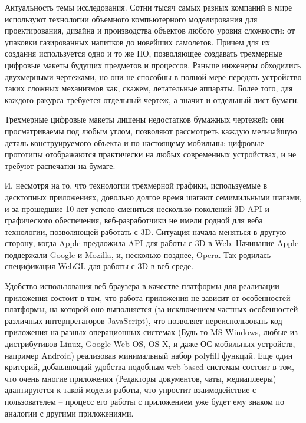\label{sec:intro}

Актуальность темы исследования. 
Сотни тысяч самых разных компаний в мире используют технологии объемного компьютерного моделирования для проектирования, дизайна и производства объектов любого уровня сложности: от упаковки 
газированных напитков до новейших самолетов. Причем для их создания используется одно и то же ПО, позволяющее создавать трехмерные цифровые макеты будущих предметов и процессов.
Раньше инженеры обходились двухмерными чертежами, но они не способны в полной мере передать устройство таких сложных механизмов как, скажем, летательные аппараты. Более того, для 
каждого ракурса требуется отдельный чертеж, а значит и отдельный лист бумаги.


Трехмерные цифровые макеты лишены недостатков бумажных чертежей: они просматриваемы под любым углом, позволяют рассмотреть каждую мельчайшую деталь конструируемого объекта и по-настоящему 
мобильны: цифровые прототипы отображаются практически на любых современных устройствах, и не требуют распечатки на бумаге. 

И, несмотря на то, что технологии трехмерной графики, используемые в десктопных приложениях, довольно долгое время шагают семимильными шагами, и за прошедшие 10 лет успело смениться 
несколько поколений 3D API и графического обеспечения, веб-разработчики не имели родной для веба технологии, позволяющей работать с 3D.
Ситуация начала меняться в другую сторону, когда Apple предложила API для работы с 3D в Web. Начинание Apple поддержали Google и Mozilla, и, несколько позднее, Opera. Так родилась 
спецификация WebGL для работы с 3D в веб-среде.

Удобство использования веб-браузера в качестве платформы для реализации приложения состоит в том, что работа приложения не зависит от особенностей платформы, на которой оно выполняется 
(за исключением частных особенностей различных интерпретаторов JavaScript), что позволяет переиспользовать код приложения на разных операционных системах (Будь то MS Windows, любые из 
дистрибутивов Linux, Google Web OS, OS X, и даже ОС мобильных устройств, например Android) реализовав минимальный набор polyfill функций. Еще один критерий, добавляющий удобства подобным 
web-based системам состоит в том, что очень многие приложения (Редакторы документов, чаты, медиаплееры) адаптируются к такой модели работы, что упростит взаимодействие с пользователем --
процесс его работы с приложением уже будет ему знаком по аналогии с другими приложениями. 
 
